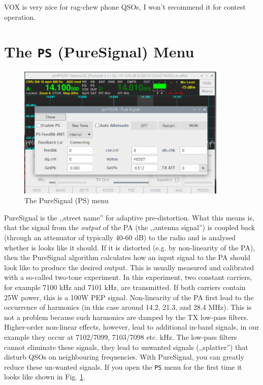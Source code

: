 \documentclass[12pt]{book}
\def\bltt#1{\texttt{\color{blue}#1}}
\begin{document}
VOX is very nice for rag-chew phone QSOs, I won't recommend it for contest operation.

\section{The \texttt{PS} (PureSignal) Menu}

\begin{figure}[ht]
\center
\includegraphics[width=10cm]{PSMenu.png}
\caption{The PureSignal (PS) menu}
\label{fig:PSMenu}
\end{figure}

PureSignal is the ,,street name'' for adaptive pre-distortion. What this means is, that
the signal from the \textit{output} of the PA (the ,,antenna signal'') is coupled
back (through an attenuator of typically 40-60 dB) to the radio and is analysed
whether is looks like it should. If it is distorted (e.g. by non-linearity of the PA),
then the PureSignal algorithm calculates how an input signal to the PA should look like
to produce the desired output. This is usually measured and calibrated with a so-called
two-tone experiment. In this experiment, two constant carriers, for example 7100 kHz
and 7101 kHz, are transmitted. If both carriers contain 25W power, this is
a 100W PEP signal. Non-linearity of the PA first lead to the occurrence of harmonics
(in this case around 14.2, 21.3, and 28.4 MHz). This is not a problem because
such harmonics are  damped by the TX low-pass filters. Higher-order non-linear effects,
however, lead to additional in-band signals, in our example they occur at
7102/7099, 7103/7098 etc. kHz. The low-pass filters cannot eliminate these signals,
they lead to unwanted signals (,,splatter'') that disturb QSOs on neighbouring
frequencies. With PureSignal, you can greatly reduce these un-wanted signals.
If you open the \bltt{PS} menu for the first time it looks like shown in Fig.
\ref{fig:PSMenu}.
\end{document}
